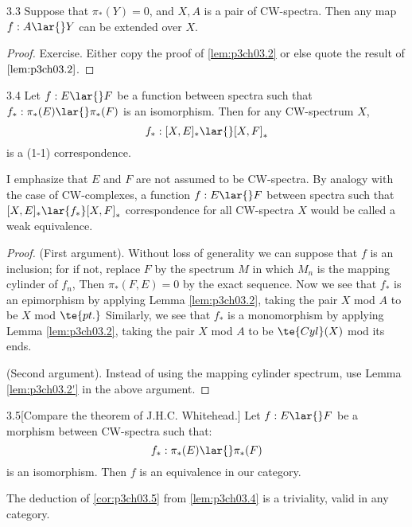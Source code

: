 \documentclass[../main]{subfiles}
\begin{document}
\begin{customlemma}{3.3} \label{lem:p3ch03.3}
Suppose that $\pi_\ast(Y)=0$, and $X,A$ is a pair of CW-spectra. Then any map $f:A\lar{}Y$ can be extended over $X$.
\end{customlemma}
\begin{proof}
Exercise. Either copy the proof of \ref{lem:p3ch03.2} or else quote the result of $\ref{lem:p3ch03.2}$.
\end{proof}

\begin{customthm}{3.4}\label{lem:p3ch03.4}
Let $f:E\lar{}F$ be a function between spectra such that $f_\ast:\pi_\ast(E)\lar{} \pi_\ast(F)$ is an isomorphism. Then for any CW-spectrum $X$, \[f_\ast:[X,E]_\ast \lar{}[X,F]_\ast\] is a (1-1) correspondence.
\end{customthm}
I emphasize that $E$ and $F$ are not assumed to be CW-spectra.
By analogy with the case of CW-complexes, a function $f: E\lar{} F$
between spectra such that $ [X,E]_\ast \lar{f_\ast}[X,F]_\ast$ correspondence
for all CW-spectra $X$ would be called a weak equivalence. 

\begin{proof}
(First argument). Without loss of generality we
can suppose that $f$ is an inclusion; for if not, replace $F$ by the
spectrum $M$ in which $M_n$ is the mapping cylinder of $f_n$, Then
$\pi_\ast(F,E) = 0$ by the exact sequence. Now we see that $f_\ast$ is an epimorphism by applying Lemma \ref{lem:p3ch03.2}, taking the pair $X$ mod $A$ to be $X$ mod $\te{pt.}$
Similarly, we see that $f_\ast$ is a monomorphism by applying Lemma \ref{lem:p3ch03.2}, taking the pair $X$ mod $A$ to be $\te{Cyl}(X)$ mod its ends.

(Second argument). Instead of using the mapping cylinder spectrum,
use Lemma \ref{lem:p3ch03.2'} in the above argument. 
\end{proof}

\begin{customcor}{3.5}[Compare the theorem of J.H.C. Whitehead.] \label{cor:p3ch03.5} Let $f:E\lar{}F$ be a morphism between CW-spectra such that:
\[f_\ast:\pi_\ast(E)\lar{} \pi_\ast(F)\]
is an isomorphism. Then $f$ is an equivalence in our category. 
\end{customcor}
The deduction of \ref{cor:p3ch03.5} from \ref{lem:p3ch03.4} is a triviality, valid in any category. 
\end{document}
